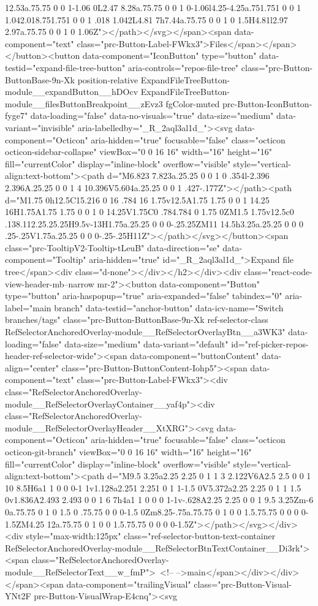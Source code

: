 {{{{{12.53a.75.75 0 0 1-1.06 0L2.47 8.28a.75.75 0 0 1 0-1.06l4.25-4.25a.751.751 0 0 1 1.042.018.751.751 0 0 1 .018 1.042L4.81 7h7.44a.75.75 0 0 1 0 1.5H4.81l2.97 2.97a.75.75 0 0 1 0 1.06Z"></path></svg></span><span data-component="text" class="prc-Button-Label-FWkx3">Files</span></span></button><button data-component="IconButton" type="button" data-testid="expand-file-tree-button" aria-controls="repos-file-tree" class="prc-Button-ButtonBase-9n-Xk position-relative ExpandFileTreeButton-module__expandButton__hDOcv ExpandFileTreeButton-module__filesButtonBreakpoint__zEvz3 fgColor-muted prc-Button-IconButton-fyge7" data-loading="false" data-no-visuals="true" data-size="medium" data-variant="invisible" aria-labelledby="_R_2aql3al1d_"><svg data-component="Octicon" aria-hidden="true" focusable="false" class="octicon octicon-sidebar-collapse" viewBox="0 0 16 16" width="16" height="16" fill="currentColor" display="inline-block" overflow="visible" style="vertical-align:text-bottom"><path d="M6.823 7.823a.25.25 0 0 1 0 .354l-2.396 2.396A.25.25 0 0 1 4 10.396V5.604a.25.25 0 0 1 .427-.177Z"></path><path d="M1.75 0h12.5C15.216 0 16 .784 16 1.75v12.5A1.75 1.75 0 0 1 14.25 16H1.75A1.75 1.75 0 0 1 0 14.25V1.75C0 .784.784 0 1.75 0ZM1.5 1.75v12.5c0 .138.112.25.25.25H9.5v-13H1.75a.25.25 0 0 0-.25.25ZM11 14.5h3.25a.25.25 0 0 0 .25-.25V1.75a.25.25 0 0 0-.25-.25H11Z"></path></svg></button><span class="prc-TooltipV2-Tooltip-tLeuB" data-direction="se" data-component="Tooltip" aria-hidden="true" id="_R_2aql3al1d_">Expand file tree</span><div class="d-none"></div></h2></div><div class="react-code-view-header-mb--narrow mr-2"><button data-component="Button" type="button" aria-haspopup="true" aria-expanded="false" tabindex="0" aria-label="main branch" data-testid="anchor-button" data-icv-name="Switch branches/tags" class="prc-Button-ButtonBase-9n-Xk ref-selector-class RefSelectorAnchoredOverlay-module__RefSelectorOverlayBtn__a3WK3" data-loading="false" data-size="medium" data-variant="default" id="ref-picker-repos-header-ref-selector-wide"><span data-component="buttonContent" data-align="center" class="prc-Button-ButtonContent-Iohp5"><span data-component="text" class="prc-Button-Label-FWkx3"><div class="RefSelectorAnchoredOverlay-module__RefSelectorOverlayContainer__yaf4p"><div class="RefSelectorAnchoredOverlay-module__RefSelectorOverlayHeader__XtXRG"><svg data-component="Octicon" aria-hidden="true" focusable="false" class="octicon octicon-git-branch" viewBox="0 0 16 16" width="16" height="16" fill="currentColor" display="inline-block" overflow="visible" style="vertical-align:text-bottom"><path d="M9.5 3.25a2.25 2.25 0 1 1 3 2.122V6A2.5 2.5 0 0 1 10 8.5H6a1 1 0 0 0-1 1v1.128a2.251 2.251 0 1 1-1.5 0V5.372a2.25 2.25 0 1 1 1.5 0v1.836A2.493 2.493 0 0 1 6 7h4a1 1 0 0 0 1-1v-.628A2.25 2.25 0 0 1 9.5 3.25Zm-6 0a.75.75 0 1 0 1.5 0 .75.75 0 0 0-1.5 0Zm8.25-.75a.75.75 0 1 0 0 1.5.75.75 0 0 0 0-1.5ZM4.25 12a.75.75 0 1 0 0 1.5.75.75 0 0 0 0-1.5Z"></path></svg></div><div style="max-width:125px" class="ref-selector-button-text-container RefSelectorAnchoredOverlay-module__RefSelectorBtnTextContainer__Di3rk"><span class="RefSelectorAnchoredOverlay-module__RefSelectorText__w_fmP"> <!-- -->main</span></div></div></span><span data-component="trailingVisual" class="prc-Button-Visual-YNt2F prc-Button-VisualWrap-E4cnq"><svg }}}}}
